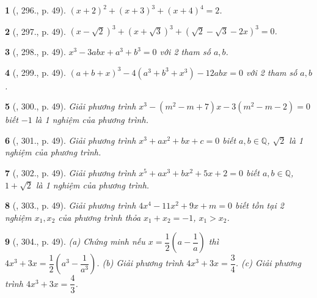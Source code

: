 \documentclass{article}
\newtheorem{baitoan}{}
\begin{document}
\begin{baitoan}[\cite{Binh_Toan_9_tap_2}, 296., p. 49]
	$(x + 2)^2 + (x + 3)^3 + (x + 4)^4 = 2$.
\end{baitoan}

\begin{baitoan}[\cite{Binh_Toan_9_tap_2}, 297., p. 49]
	$(x - \sqrt{2})^3 + (x + \sqrt{3})^3 + (\sqrt{2} - \sqrt{3} - 2x)^3 = 0$.
\end{baitoan}

\begin{baitoan}[\cite{Binh_Toan_9_tap_2}, 298., p. 49]
	$x^3 - 3abx + a^3 + b^3 = 0$ với 2 tham số $a,b$.
\end{baitoan}

\begin{baitoan}[\cite{Binh_Toan_9_tap_2}, 299., p. 49]
	$(a + b + x)^3 - 4(a^3 + b^3 + x^3) - 12abx = 0$ với 2 tham số $a,b$.
\end{baitoan}

\begin{baitoan}[\cite{Binh_Toan_9_tap_2}, 300., p. 49]
	Giải phương trình $x^3 - (m^2 - m + 7)x - 3(m^2 - m - 2) = 0$ biết $-1$ là 1 nghiệm của phương trình.
\end{baitoan}

\begin{baitoan}[\cite{Binh_Toan_9_tap_2}, 301., p. 49]
	Giải phương trình $x^3 + ax^2 + bx + c = 0$ biết $a,b\in\mathbb{Q}$, $\sqrt{2}$ là 1 nghiệm của phương trình.
\end{baitoan}

\begin{baitoan}[\cite{Binh_Toan_9_tap_2}, 302., p. 49]
	Giải phương trình $x^5 + ax^3 + bx^2 + 5x + 2 = 0$ biết $a,b\in\mathbb{Q}$, $1 + \sqrt{2}$ là 1 nghiệm của phương trình.
\end{baitoan}

\begin{baitoan}[\cite{Binh_Toan_9_tap_2}, 303., p. 49]
	Giải phương trình $4x^4 - 11x^2 + 9x + m = 0$ biết tồn tại 2 nghiệm $x_1,x_2$ của phương trình thỏa $x_1 + x_2 = -1$, $x_1 > x_2$.
\end{baitoan}

\begin{baitoan}[\cite{Binh_Toan_9_tap_2}, 304., p. 49]
	(a) Chứng minh nếu $x = \dfrac{1}{2}\left(a - \dfrac{1}{a}\right)$ thì $4x^3 + 3x = \dfrac{1}{2}\left(a^3 - \dfrac{1}{a^3}\right)$. (b) Giải phương trình $4x^3 + 3x = \dfrac{3}{4}$. (c) Giải phương trình $4x^3 + 3x = \dfrac{4}{3}$.
\end{baitoan}
\end{document}
